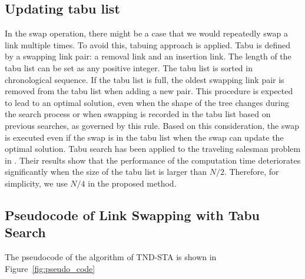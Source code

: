 \documentclass[10pt,english]{article}
\newcommand{\figref}[1]{Figure~\ref{#1}}
\begin{document}
\subsection{Updating tabu list}

In the swap operation, there might be a case that we would repeatedly swap a link multiple times.
To avoid this, tabuing approach is applied. Tabu is defined by a swapping link pair: a removal link and an insertion link. The length of the tabu list can be set as any positive integer. 
The tabu list is sorted in chronological sequence. If the tabu list is full, the oldest swapping link pair is removed from the tabu list when adding a new pair. 
This procedure is expected to lead to an optimal solution, even when the shape of the tree changes during the search process or when swapping is recorded in the tabu list based on previous searches, as governed by this rule. Based on this consideration, the swap is executed even if the swap is in the tabu list when the swap can update the optimal solution. 
Tabu search has been applied to the traveling salesman problem in \citet{Tsubakitani1998}. 
Their results show that the performance of the computation time deteriorates significantly when the size of the tabu list is larger than $N/2$. 
Therefore, for simplicity, we use $N/4$ in the proposed method.

\subsection{Pseudocode of Link Swapping with Tabu Search}
The pseudocode of the algorithm of TND-STA is shown in \figref{fig:pseudo_code}
\end{document}
